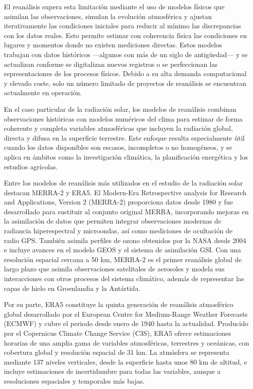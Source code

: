 \documentclass[letterpaper,12pt, twoside]{report}
\providecommand{\DIFdeltex}[1]{{\protect\color{red} \scriptsize #1}} %
\providecommand{\DIFdel}[1]{\texorpdfstring{\DIFdeltex{#1}}{}} %
\begin{document}
\DIFdel{El reanálisis supera esta limitación mediante el uso de modelos físicos que asimilan las observaciones, simulan la evolución atmosférica y ajustan iterativamente las condiciones iniciales para reducir al mínimo las discrepancias con los datos reales. Esto permite estimar con coherencia física las condiciones en lugares y momentos donde no existen mediciones directas. Estos modelos trabajan con datos históricos —algunos con más de un siglo de antigüedad— y se actualizan conforme se digitalizan nuevos registros o se perfeccionan las representaciones de los procesos físicos. Debido a su alta demanda computacional y elevado coste, solo un número limitado de proyectos de reanálisis se encuentran actualmente en operación.
}%

\DIFdel{En el caso particular de la radiación solar, los modelos de reanálisis combinan observaciones históricas con modelos numéricos del clima para estimar de forma coherente y completa variables atmosféricas que incluyen la radiación global, directa y difusa en la superficie terrestre. Este enfoque resulta especialmente útil cuando los datos disponibles son escasos, incompletos o no homogéneos, y se aplica en ámbitos como la investigación climática, la planificación energética y los estudios agrícolas.
}%

\DIFdel{Entre los modelos de reanálisis más utilizados en el estudio de la radiación solar destacan MERRA-2 y ERA5. El Modern-Era Retrospective analysis for Research and Applications, Version 2 (MERRA-2) proporciona datos desde 1980 y fue desarrollado para sustituir al conjunto original MERRA, incorporando mejoras en la asimilación de datos que permiten integrar observaciones modernas de radiancia hiperespectral y microondas, así como mediciones de ocultación de radio GPS. También asimila perfiles de ozono obtenidos por la NASA desde 2004 e incluye avances en el modelo GEOS y el sistema de asimilación GSI. Con una resolución espacial cercana a 50 km, MERRA-2 es el primer reanálisis global de largo plazo que asimila observaciones satelitales de aerosoles y modela sus interacciones con otros procesos del sistema climático, además de representar las capas de hielo en Groenlandia y la Antártida.
}%

\DIFdel{Por su parte, ERA5 constituye la quinta generación de reanálisis atmosférico global desarrollado por el European Centre for Medium-Range Weather Forecasts (ECMWF) y cubre el periodo desde enero de 1940 hasta la actualidad. Producido por el Copernicus Climate Change Service (C3S), ERA5 ofrece estimaciones horarias de una amplia gama de variables atmosféricas, terrestres y oceánicas, con cobertura global y resolución espacial de 31 km. La atmósfera se representa mediante 137 niveles verticales, desde la superficie hasta unos 80 km de altitud, e incluye estimaciones de incertidumbre para todas las variables, aunque a resoluciones espaciales y temporales más bajas.
}%
\end{document}

